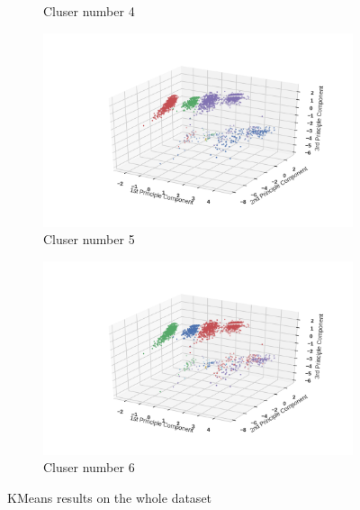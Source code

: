 \documentclass[12pt]{article}
\begin{document}
\begin{figure}
\begin{subfigure}[b]{0.31\textwidth}
        \caption{Cluser number 4}
        \label{fig:KMeans-trainbywhole-4}
    \end{subfigure}
    
    \begin{subfigure}[b]{0.31\textwidth}
        \includegraphics[width=\textwidth]{images/KMeans-trainbywhole-5.png}
        \caption{Cluser number 5}
        \label{fig:KMeans-trainbywhole-5}
    \end{subfigure}
    \begin{subfigure}[b]{0.31\textwidth}
        \includegraphics[width=\textwidth]{images/KMeans-trainbywhole-6.png}
        \caption{Cluser number 6}
        \label{fig:KMeans-trainbywhole-6}
    \end{subfigure}
    \label{fig:KMeans-trainbywhole}
    \caption{KMeans results on the whole dataset}
\end{figure}
\end{document}
